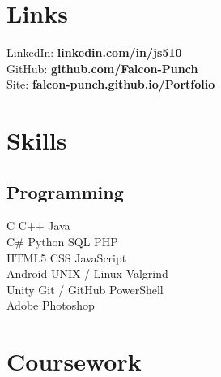 \documentclass[letterpaper]{deedy-resume} %
\newcommand{\CS}{C\#}
\begin{document}
\begin{minipage}[t]{0.33\textwidth}
\sectionspace %




\section{Links} 

LinkedIn: {\bf linkedin.com/in/js510}\\
GitHub: {\bf github.com/Falcon-Punch}\\
Site: {\bf falcon-punch.github.io/Portfolio}

\sectionspace %


\section{Skills}

\subsection{Programming}
\vspace{1.5mm}
C \textbullet{} C++ \textbullet{} Java \\
\vspace{1.5mm}
\CS{} \textbullet{} Python \textbullet{} SQL \textbullet{} PHP \\
HTML5 \textbullet{} CSS \textbullet{} JavaScript \\
\vspace{1.5mm}
Android \textbullet{} UNIX / Linux \textbullet{} Valgrind \\
Unity \textbullet{} Git / GitHub \textbullet{} PowerShell \\
Adobe Photoshop

\sectionspace %



\section{Coursework}


\end{minipage}
\end{document}
